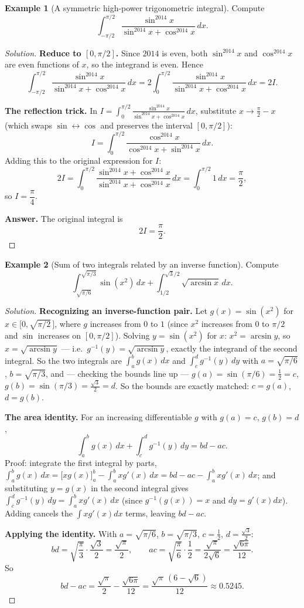 \documentclass[11pt]{article}
\theoremstyle{definition}
\newtheorem{example}{Example}[section]
\begin{document}
\begin{example}[A symmetric high-power trigonometric integral]
Compute
\[
\int_{-\pi/2}^{\pi/2}\frac{\sin^{2014}x}{\sin^{2014}x+\cos^{2014}x}\,dx.
\]
\end{example}
\begin{proof}[Solution]
\textbf{Reduce to $[0,\pi/2]$.} Since $2014$ is even, both $\sin^{2014}x$ and $\cos^{2014}x$ are even functions of $x$, so the integrand is even. Hence
\[
\int_{-\pi/2}^{\pi/2}\frac{\sin^{2014}x}{\sin^{2014}x+\cos^{2014}x}\,dx=2\int_0^{\pi/2}\frac{\sin^{2014}x}{\sin^{2014}x+\cos^{2014}x}\,dx=2I.
\]

\textbf{The reflection trick.} In $I=\int_0^{\pi/2}\frac{\sin^{2014}x}{\sin^{2014}x+\cos^{2014}x}\,dx$, substitute $x\to\frac\pi2-x$ (which swaps $\sin\leftrightarrow\cos$ and preserves the interval $[0,\pi/2]$):
\[
I=\int_0^{\pi/2}\frac{\cos^{2014}x}{\cos^{2014}x+\sin^{2014}x}\,dx.
\]
Adding this to the original expression for $I$:
\[
2I=\int_0^{\pi/2}\frac{\sin^{2014}x+\cos^{2014}x}{\sin^{2014}x+\cos^{2014}x}\,dx=\int_0^{\pi/2}1\,dx=\frac\pi2,
\]
so $I=\dfrac\pi4$.

\textbf{Answer.} The original integral is
\[
\boxed{2I=\frac\pi2}.
\]
\end{proof}

\begin{example}[Sum of two integrals related by an inverse function]
Compute
\[
\int_{\sqrt{\pi/6}}^{\sqrt{\pi/3}}\sin(x^2)\,dx+\int_{1/2}^{\sqrt3/2}\sqrt{\arcsin x}\,dx.
\]
\end{example}
\begin{proof}[Solution]
\textbf{Recognizing an inverse-function pair.} Let $g(x)=\sin(x^2)$ for $x\in\bigl[0,\sqrt{\pi/2}\,\bigr]$, where $g$ increases from $0$ to $1$ (since $x^2$ increases from $0$ to $\pi/2$ and $\sin$ increases on $[0,\pi/2]$). Solving $y=\sin(x^2)$ for $x$: $x^2=\arcsin y$, so $x=\sqrt{\arcsin y}$ — i.e.\ $g^{-1}(y)=\sqrt{\arcsin y}$, exactly the integrand of the second integral. So the two integrals are $\int_a^bg(x)\,dx$ and $\int_c^dg^{-1}(y)\,dy$ with $a=\sqrt{\pi/6}$, $b=\sqrt{\pi/3}$, and — checking the bounds line up — $g(a)=\sin(\pi/6)=\tfrac12=c$, $g(b)=\sin(\pi/3)=\tfrac{\sqrt3}2=d$. So the bounds are exactly matched: $c=g(a)$, $d=g(b)$.

\textbf{The area identity.} For an increasing differentiable $g$ with $g(a)=c$, $g(b)=d$,
\[
\int_a^bg(x)\,dx+\int_c^dg^{-1}(y)\,dy=bd-ac.
\]
Proof: integrate the first integral by parts, $\int_a^bg(x)\,dx=\bigl[xg(x)\bigr]_a^b-\int_a^bxg'(x)\,dx=bd-ac-\int_a^bxg'(x)\,dx$; and substituting $y=g(x)$ in the second integral gives $\int_c^dg^{-1}(y)\,dy=\int_a^bx g'(x)\,dx$ (since $g^{-1}(g(x))=x$ and $dy=g'(x)dx$). Adding cancels the $\int xg'(x)dx$ terms, leaving $bd-ac$.

\textbf{Applying the identity.} With $a=\sqrt{\pi/6}$, $b=\sqrt{\pi/3}$, $c=\tfrac12$, $d=\tfrac{\sqrt3}2$:
\[
bd=\sqrt{\frac\pi3}\cdot\frac{\sqrt3}2=\frac{\sqrt\pi}2,\qquad ac=\sqrt{\frac\pi6}\cdot\frac12=\frac{\sqrt\pi}{2\sqrt6}=\frac{\sqrt{6\pi}}{12}.
\]
So
\[
\boxed{bd-ac=\frac{\sqrt\pi}2-\frac{\sqrt{6\pi}}{12}=\frac{\sqrt\pi\,(6-\sqrt6)}{12}}\approx0.5245.
\]
\end{proof}
\end{document}
